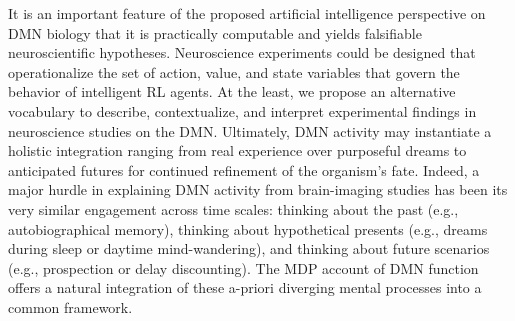 \documentclass[10pt,letterpaper]{article}
\begin{document}
It is an important feature of the proposed artificial intelligence perspective
on DMN biology that it is practically computable and
yields falsifiable neuroscientific hypotheses.
%
Neuroscience experiments could be designed that operationalize
the set of action, value, and state variables that govern
the behavior of intelligent RL agents.
%
At the least, we propose an alternative vocabulary to
describe, contextualize, and interpret experimental findings in neuroscience studies
on the DMN.
%
Ultimately,
DMN activity may instantiate a holistic integration
ranging from real experience over purposeful dreams to anticipated futures
for continued refinement of the organism's fate. Indeed, a major hurdle in explaining DMN activity from brain-imaging studies has been its very similar engagement across time scales: thinking about the past (e.g., autobiographical memory), thinking about hypothetical presents (e.g., dreams during sleep or daytime mind-wandering), and thinking about future scenarios (e.g., prospection or delay discounting). The MDP account of DMN function offers a natural integration of these a-priori diverging mental processes into a common framework. %






\small
% 
% 


\end{document}
